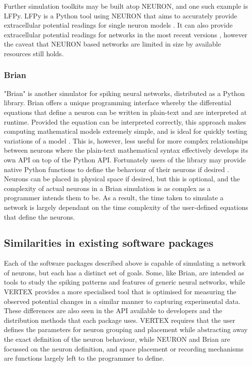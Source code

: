 Further simulation toolkits may be built atop NEURON, and one such example is
LFPy. LFPy is a Python tool using NEURON that aims to accurately provide
extracellular potential readings for single neuron models
\autocite{hagen_hybrid_2016}. It can also provide extracellular potential
readings for networks in the most recent versions \autocite{hagen_lfpy_2019},
however the caveat that NEURON based networks are limited in size by available
resources still holds.

\subsubsection{Brian}

"Brian" is another simulator for spiking neural networks, distributed as a
Python library. Brian offers a unique programming interface whereby the
differential equations that define a neuron can be written in plain-text and are
interpreted at runtime. Provided the equation can be interpreted correctly, this
approach makes computing mathematical models extremely simple, and is ideal for
quickly testing variations of a model \autocite{stimberg_brian_2019}. This is,
however, less useful for more complex relationships between neurons where the
plain-text mathematical syntax effectively develops its own API on top of the
Python API. Fortunately users of the library may provide native Python functions
to define the behaviour of their neurons if desired
\autocite{noauthor_functions_2020}. Neurons can be placed in physical space if
desired, but this is optional, and the complexity of actual neurons in a Brian
simulation is as complex as a programmer intends them to be. As a result, the
time taken to simulate a network is largely dependant on the time complexity of
the user-defined equations that define the neurons.

\subsection{Similarities in existing software packages}

Each of the software packages described above is capable of simulating a
network of neurons, but each has a distinct set of goals. Some, like Brian, are
intended as tools to study the spiking patterns and features of generic neural
networks, while VERTEX provides a more specialised tool that is optimised for
measuring the observed potential changes in a similar manner to capturing
experimental data. These differences are also seen in the API available to
developers
and the distribution methods that each package uses. VERTEX requires that the
user defines the parameters for neuron grouping and placement while abstracting
away the exact definition of the neuron behaviour, while NEURON and Brian are focussed on the neuron definition, and space placement or recording
mechanisms are functions largely left to the programmer to define.